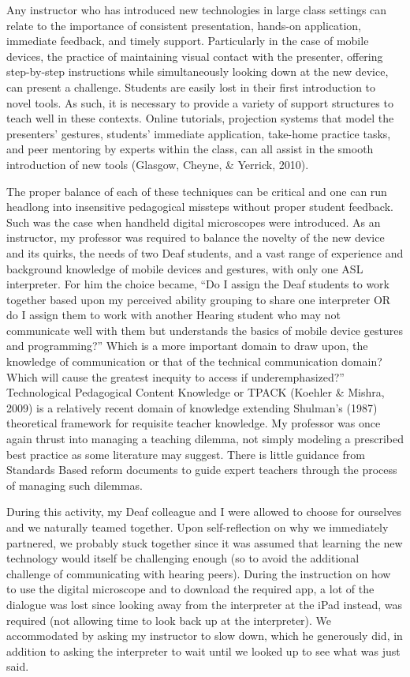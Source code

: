 \documentclass[11.5pt]{sig-alternate} %
\begin{document}
\begin{large}
Any instructor who has introduced new technologies in large class settings can relate to the importance of consistent presentation, hands-on application, immediate feedback, and timely support.  Particularly in the case of mobile devices, the practice of maintaining visual contact with the presenter, offering step-by-step instructions while simultaneously looking down at the new device, can present a challenge.  Students are easily lost in their first introduction to novel tools.  As such, it is necessary to provide a variety of support structures to teach well in these contexts.  Online tutorials, projection systems that model the presenters’ gestures, students’ immediate application, take-home practice tasks, and peer mentoring by experts within the class, can all assist in the smooth introduction of new tools (Glasgow, Cheyne, \& Yerrick, 2010).  

The proper balance of each of these techniques can be critical and one can run headlong into insensitive pedagogical missteps without proper student feedback.  Such was the case when handheld digital microscopes were introduced.  As an instructor, my professor was required to balance the novelty of the new device and its quirks, the needs of two Deaf students, and a vast range of experience and background knowledge of mobile devices and gestures, with only one ASL interpreter.   For him the choice became, “Do I assign the Deaf students to work together based upon my perceived ability grouping to share one interpreter OR do I assign them to work with another Hearing student who may not communicate well with them but understands the basics of mobile device gestures and programming?”  Which is a more important domain to draw upon, the knowledge of communication or that of the technical communication domain?   Which will cause the greatest inequity to access if underemphasized?”  Technological Pedagogical Content Knowledge or TPACK (Koehler \& Mishra, 2009) is a relatively recent domain of knowledge extending Shulman’s (1987) theoretical framework for requisite teacher knowledge.   My professor was once again thrust into managing a teaching dilemma, not simply modeling a prescribed best practice as some literature may suggest. There is little guidance from Standards Based reform documents to guide expert teachers through the process of managing such dilemmas.

During this activity, my Deaf colleague and I were allowed to choose for ourselves and we naturally teamed together.  Upon self-reflection on why we immediately partnered, we probably stuck together since it was assumed that learning the new technology would itself be challenging enough (so to avoid the additional challenge of communicating with hearing peers).  During the instruction on how to use the digital microscope and to download the required app, a lot of the dialogue was lost since looking away from the interpreter at the iPad instead, was required (not allowing time to look back up at the interpreter).  We accommodated by asking my instructor to slow down, which he generously did, in addition to asking the interpreter to wait until we looked up to see what was just said.  


\end{large}
\end{document}
